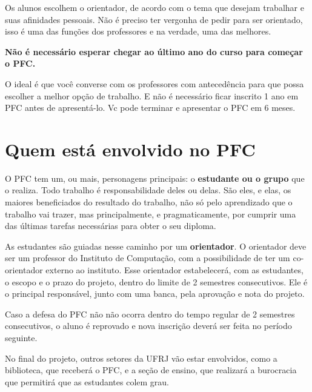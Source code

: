 Os alunos escolhem o orientador, de acordo com o tema que desejam trabalhar e suas afinidades pessoais. Não é preciso ter vergonha de pedir para ser orientado, isso é uma das funções dos professores e na verdade, uma das melhores.

\textbf{Não é necessário esperar chegar ao último ano do curso para começar o PFC. }

O ideal é que você converse com os professores com antecedência para que possa escolher a melhor opção de trabalho. E não é necessário ficar inscrito 1 ano em PFC antes de apresentá-lo. Vc pode terminar e apresentar o PFC em 6 meses.

\section{Quem está envolvido no PFC}

O PFC tem um, ou mais, personagens principais: o \textbf{estudante ou o grupo} que o realiza. Todo trabalho é responsabilidade deles ou delas. São eles, e elas, os maiores beneficiados do resultado do trabalho, não só pelo aprendizado que o trabalho vai trazer, mas principalmente, e pragmaticamente, por cumprir uma das últimas tarefas necessárias para obter o seu diploma.

As estudantes são guiadas nesse caminho por um \textbf{orientador}. O orientador deve ser um professor do Instituto de Computação, com a possibilidade de ter um co-orientador externo ao instituto. Esse orientador estabelecerá, com as estudantes, o escopo e o prazo do projeto, dentro do limite de 2 semestres consecutivos. Ele é o principal responsável, junto com uma banca, pela aprovação e nota do projeto.

Caso a defesa do PFC não não ocorra dentro do tempo regular de 2 semestres consecutivos, o aluno é reprovado e nova inscrição deverá ser feita no período seguinte.

No final do projeto, outros setores da UFRJ vão estar envolvidos, como a biblioteca, que receberá o PFC, e a seção de ensino, que realizará a burocracia que permitirá que as estudantes colem grau.


